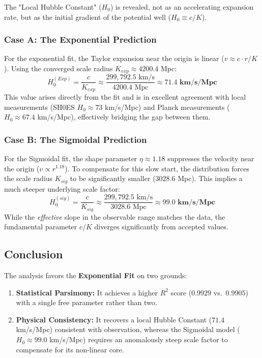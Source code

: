 \documentclass[11pt]{article}
\begin{document}
The "Local Hubble Constant" ($H_0$) is revealed, not as an accelerating expansion rate, but as the initial gradient of the potential well ($H_0 \equiv c/K$).

\subsubsection{Case A: The Exponential Prediction}
For the exponential fit, the Taylor expansion near the origin is linear ($v \approx c \cdot r/K$). Using the converged scale radius $K_{exp} \approx 4200.4$ Mpc:
\begin{equation}
    H_0^{(Exp)} = \frac{c}{K_{exp}} \approx \frac{299,792.5 \text{ km/s}}{4200.4 \text{ Mpc}} \approx \mathbf{71.4 \text{ km/s/Mpc}}
\end{equation}
This value arises directly from the fit and is in excellent agreement with local measurements (SH0ES $H_0 \approx 73$ km/s/Mpc) and Planck measurements ($H_0 \approx 67.4$ km/s/Mpc), effectively bridging the gap between them.

\subsubsection{Case B: The Sigmoidal Prediction}
For the Sigmoidal fit, the shape parameter $\eta \approx 1.18$ suppresses the velocity near the origin ($v \propto r^{1.18}$). To compensate for this slow start, the distribution forces the scale radius $K_{sig}$ to be significantly smaller ($3028.6$ Mpc). This implies a much steeper underlying scale factor:
\begin{equation}
    H_0^{(sig)} = \frac{c}{K_{sig}} \approx \frac{299,792.5 \text{ km/s}}{3028.6 \text{ Mpc}} \approx \mathbf{99.0 \text{ km/s/Mpc}}
\end{equation}
While the \textit{effective} slope in the observable range matches the data, the fundamental parameter $c/K$ diverges significantly from accepted values.

\subsection{Conclusion}

The analysis favors the \textbf{Exponential Fit} on two grounds:
\begin{enumerate}
    \item \textbf{Statistical Parsimony:} It achieves a higher $R^2$ score ($0.9929$ vs.\ $0.9905$) with a single free parameter rather than two.
    \item \textbf{Physical Consistency:} It recovers a local Hubble Constant ($71.4$ km/s/Mpc) consistent with observation, whereas the Sigmoidal model ($H_0 \approx 99.0$ km/s/Mpc) requires an anomalously steep scale factor to compensate for its non-linear core.
\end{enumerate}
\end{document}
